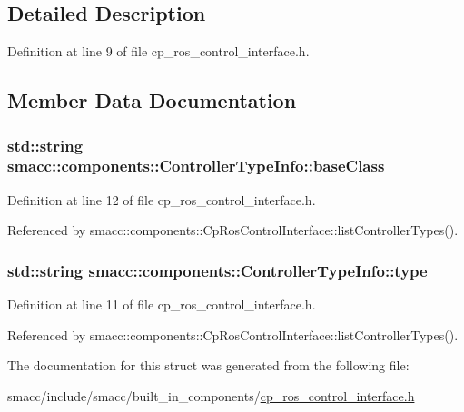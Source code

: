 \subsection{Detailed Description}


Definition at line 9 of file cp\+\_\+ros\+\_\+control\+\_\+interface.\+h.



\subsection{Member Data Documentation}
\subsubsection[{\texorpdfstring{base\+Class}{baseClass}}]{\setlength{\rightskip}{0pt plus 5cm}std\+::string smacc\+::components\+::\+Controller\+Type\+Info\+::base\+Class}\hypertarget{structsmacc_1_1components_1_1ControllerTypeInfo_a4506855fc728c39046bdb4f98a6a61f3}{}\label{structsmacc_1_1components_1_1ControllerTypeInfo_a4506855fc728c39046bdb4f98a6a61f3}


Definition at line 12 of file cp\+\_\+ros\+\_\+control\+\_\+interface.\+h.



Referenced by smacc\+::components\+::\+Cp\+Ros\+Control\+Interface\+::list\+Controller\+Types().

\subsubsection[{\texorpdfstring{type}{type}}]{\setlength{\rightskip}{0pt plus 5cm}std\+::string smacc\+::components\+::\+Controller\+Type\+Info\+::type}\hypertarget{structsmacc_1_1components_1_1ControllerTypeInfo_a8b66de0e92b5b6b913d6b802a0495637}{}\label{structsmacc_1_1components_1_1ControllerTypeInfo_a8b66de0e92b5b6b913d6b802a0495637}


Definition at line 11 of file cp\+\_\+ros\+\_\+control\+\_\+interface.\+h.



Referenced by smacc\+::components\+::\+Cp\+Ros\+Control\+Interface\+::list\+Controller\+Types().



The documentation for this struct was generated from the following file\+:\begin{DoxyCompactItemize}
\item 
smacc/include/smacc/built\+\_\+in\+\_\+components/\hyperlink{cp__ros__control__interface_8h}{cp\+\_\+ros\+\_\+control\+\_\+interface.\+h}\end{DoxyCompactItemize}
